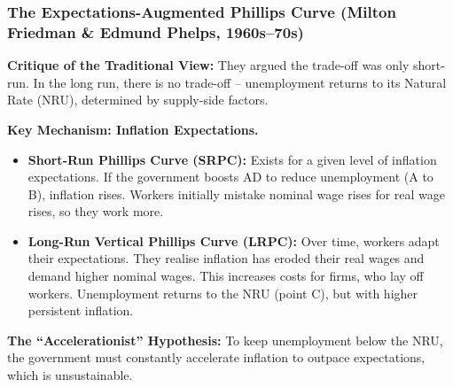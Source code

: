 \documentclass[11pt, a4paper, twoside]{book}
\begin{document}
\subsubsection{The Expectations-Augmented Phillips Curve (Milton Friedman \& Edmund Phelps, 1960s--70s)}

\textbf{Critique of the Traditional View:} They argued the trade-off was only short-run. In the long run, there is no trade-off -- unemployment returns to its Natural Rate (NRU), determined by supply-side factors.

\textbf{Key Mechanism: Inflation Expectations.}
\begin{itemize}
  \item \textbf{Short-Run Phillips Curve (SRPC):} Exists for a given level of inflation expectations. If the government boosts AD to reduce unemployment (A to B), inflation rises. Workers initially mistake nominal wage rises for real wage rises, so they work more.
  \item \textbf{Long-Run Vertical Phillips Curve (LRPC):} Over time, workers adapt their expectations. They realise inflation has eroded their real wages and demand higher nominal wages. This increases costs for firms, who lay off workers. Unemployment returns to the NRU (point C), but with higher persistent inflation.
\end{itemize}

\begin{coreidea}
\textbf{The ``Accelerationist'' Hypothesis:} To keep unemployment below the NRU, the government must constantly accelerate inflation to outpace expectations, which is unsustainable.
\end{coreidea}
\end{document}
